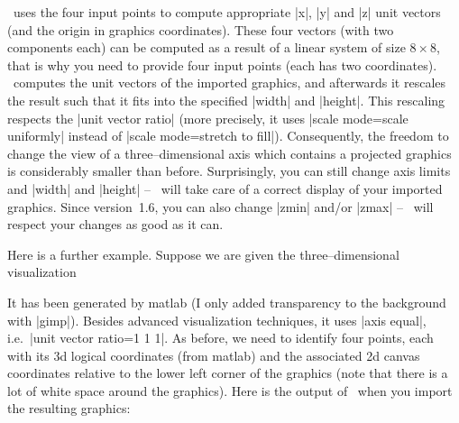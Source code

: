 {{\begin{codeexample}[]
\end{codeexample}
\noindent \PGFPlots\ uses the four input points to compute appropriate |x|, |y| and |z| unit vectors (and the origin in graphics coordinates). These four vectors (with two components each) can be computed as a result of a linear system of size $8\times 8$, that is why you need to provide four input points (each has two coordinates). \PGFPlots\ computes the unit vectors of the imported graphics, and afterwards it rescales the result such that it fits into the specified |width| and |height|. This rescaling respects the |unit vector ratio| (more precisely, it uses |scale mode=scale uniformly| instead of |scale mode=stretch to fill|). Consequently, the freedom to change the view of a three--dimensional axis which contains a projected graphics is considerably smaller than before. Surprisingly, you can still change axis limits and |width| and |height| -- \PGFPlots\ will take care of a correct display of your imported graphics. Since version~1.6, you can also change |zmin| and/or |zmax| -- \PGFPlots\ will respect your changes as good as it can.

Here is a further example. Suppose we are given the three--dimensional visualization

{\setlength{\fboxsep}{0pt}%
\centering
{}%

}%

It has been generated by matlab (I only added transparency to the background with |gimp|). Besides advanced visualization techniques, it uses |axis equal|, i.e.\ |unit vector ratio=1 1 1|. As before, we need to identify four points, each with its 3d logical coordinates (from matlab) and the associated 2d canvas coordinates relative to the lower left corner of the graphics (note that there is a lot of white space around the graphics). Here is the output of \PGFPlots\ when you import the resulting graphics:

}}
